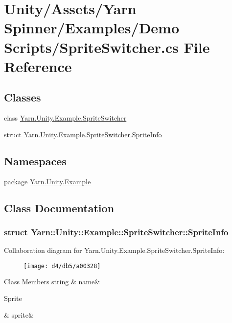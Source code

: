 \hypertarget{a00262}{\section{Unity/\-Assets/\-Yarn Spinner/\-Examples/\-Demo Scripts/\-Sprite\-Switcher.cs File Reference}
\label{a00262}
}
\subsection*{Classes}
\begin{DoxyCompactItemize}
\item 
class \hyperlink{a00139}{Yarn.\-Unity.\-Example.\-Sprite\-Switcher}
\item 
struct \hyperlink{a00139_de/d55/a00323}{Yarn.\-Unity.\-Example.\-Sprite\-Switcher.\-Sprite\-Info}
\end{DoxyCompactItemize}
\subsection*{Namespaces}
\begin{DoxyCompactItemize}
\item 
package \hyperlink{a00312}{Yarn.\-Unity.\-Example}
\end{DoxyCompactItemize}


\subsection{Class Documentation}
\label{de/d55/a00323}
\hypertarget{a00139_de/d55/a00323}{}
\subsubsection{struct Yarn\-:\-:Unity\-:\-:Example\-:\-:Sprite\-Switcher\-:\-:Sprite\-Info}


Collaboration diagram for Yarn.\-Unity.\-Example.\-Sprite\-Switcher.\-Sprite\-Info\-:
\nopagebreak
\begin{figure}[H]
\begin{center}
\leavevmode
\texttt{[image: d4/db5/a00328]}
\end{center}
\end{figure}
\begin{DoxyFields}{Class Members}
\hypertarget{a00139_a3f5bca2fff413dfe075c1fcf7e58369c}{string}\label{a00139_a3f5bca2fff413dfe075c1fcf7e58369c}
&
name&
\\
\hline

\hypertarget{a00139_adc58df011dc2841837b6cf775b372061}{Sprite}\label{a00139_adc58df011dc2841837b6cf775b372061}
&
sprite&
\\
\hline

\end{DoxyFields}
